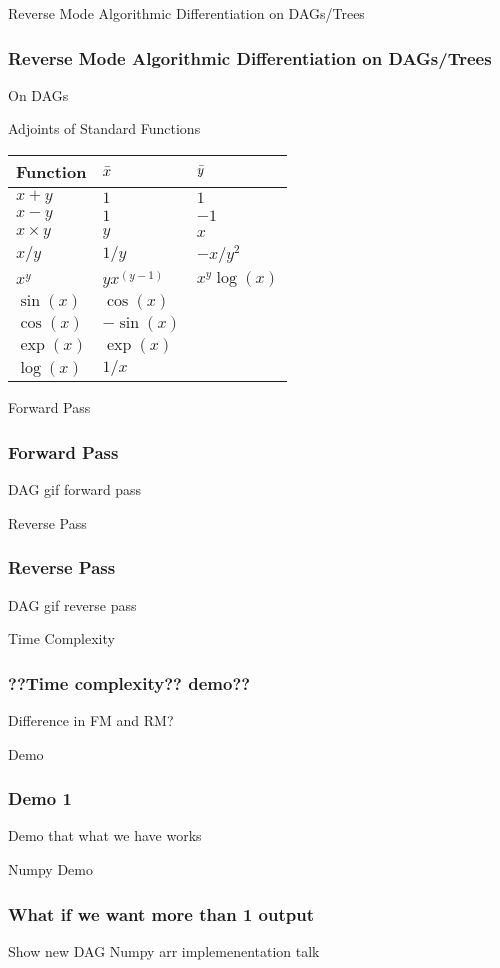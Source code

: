 \documentclass{beamer}
\begin{document}
\begin{frame}{Reverse Mode Algorithmic Differentiation on DAGs/Trees}
\frametitle{Reverse Mode Algorithmic Differentiation on DAGs/Trees}
On DAGs
\end{frame}

\begin{frame}{Adjoints of Standard Functions}
    \begin{table}[h!]
    \centering
    \begin{tabular}{|lll|}
        \hline
        Function & $\Bar{x}$ & $\Bar{y}$ \\
        \hline
        $x+y$ & $1$ & $1$ \\
        $x-y$ & $1$ & $-1$ \\
        $x \times y$ & $y$ & $x$ \\
        $x / y$ & $1/y$ & $-x/y^2$ \\
        $x^y$ & $y{x}^{(y-1)}$ & ${x}^{y}\log(x)$ \\
        $\sin(x)$ & $\cos(x)$ &  \\
        $\cos(x)$ & $-\sin(x)$ &  \\
        $\exp(x)$ & $\exp(x)$ &  \\
        $\log(x)$ & $1/x$ &  \\
        \hline
    \end{tabular}
    \label{tab:Adjelementals}
    \end{table}
\end{frame}

\begin{frame}{Forward Pass}
\frametitle{Forward Pass}
DAG gif forward pass
\end{frame}

\begin{frame}{Reverse Pass}
\frametitle{Reverse Pass}
DAG gif reverse pass
\end{frame}

\begin{frame}{Time Complexity}
\frametitle{??Time complexity?? demo??}
Difference in FM and RM?
\end{frame}

\begin{frame}{Demo}
\frametitle{Demo 1}
Demo that what we have works
\end{frame}

\begin{frame}{Numpy Demo}
\frametitle{What if we want more than 1 output}
Show new DAG
Numpy arr implemenentation talk
\end{frame}
\end{document}
